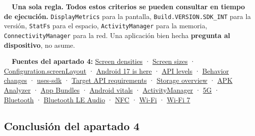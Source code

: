 \documentclass[11pt,a4paper]{article}
\newcommand{\code}[1]{\texttt{\color{primary}#1}}
\begin{document}
	\begin{ideabox}
		\textbf{\color{mint!70!black}\faLightbulb\ \ Una sola regla.}
		\textbf{Todos estos criterios se pueden consultar en tiempo de ejecución.} \code{DisplayMetrics} para la pantalla, \code{Build.VERSION.SDK\_INT} para la versión, \code{StatFs} para el espacio, \code{ActivityManager} para la memoria, \code{ConnectivityManager} para la red. Una aplicación bien hecha \textbf{pregunta al dispositivo}, no asume.
	\end{ideabox}
	
	\begin{fuentesbox}
		\textbf{\color{muted}\faBook\ \ Fuentes del apartado 4:}
		\href{https://developer.android.com/training/multiscreen/screendensities}{Screen densities} ·
		\href{https://developer.android.com/training/multiscreen/screensizes}{Screen sizes} ·
		\href{https://developer.android.com/reference/android/content/res/Configuration}{Configuration.screenLayout} ·
		\href{https://developer.android.com/blog/posts/android-17-is-here}{Android 17 is here} ·
		\href{https://developer.android.com/tools/releases/platforms}{API levels} ·
		\href{https://developer.android.com/about/versions/17/behavior-changes-all}{Behavior changes} ·
		\href{https://developer.android.com/guide/topics/manifest/uses-sdk-element}{uses-sdk} ·
		\href{https://support.google.com/googleplay/android-developer/answer/11926878}{Target API requirements} ·
		\href{https://developer.android.com/training/data-storage}{Storage overview} ·
		\href{https://developer.android.com/studio/debug/apk-analyzer}{APK Analyzer} ·
		\href{https://developer.android.com/guide/app-bundle/dynamic-delivery}{App Bundles} ·
		\href{https://developer.android.com/topic/performance/vitals}{Android vitals} ·
		\href{https://developer.android.com/reference/android/app/ActivityManager}{ActivityManager} ·
		\href{https://developer.android.com/develop/connectivity/5g}{5G} ·
		\href{https://developer.android.com/develop/connectivity/bluetooth}{Bluetooth} ·
		\href{https://developer.android.com/develop/connectivity/bluetooth/ble-audio/overview}{Bluetooth LE Audio} ·
		\href{https://developer.android.com/develop/connectivity/nfc}{NFC} ·
		\href{https://developer.android.com/develop/connectivity/wifi}{Wi-Fi} ·
		\href{https://source.android.com/docs/core/connect/wifi-7}{Wi-Fi 7}
	\end{fuentesbox}
	
	\subsection{Conclusión del apartado 4}
	
\end{document}
